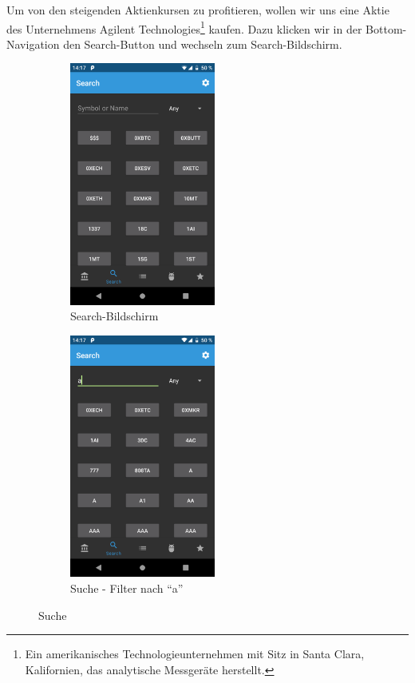 \documentclass[a4paper]{article}
\begin{document}
 Um von den steigenden Aktienkursen zu profitieren, wollen wir uns eine Aktie des Unternehmens Agilent Technologies\footnote{Ein amerikanisches Technologieunternehmen mit Sitz in Santa Clara, Kalifornien, das analytische Messgeräte herstellt.} kaufen. Dazu klicken wir in der Bottom-Navigation den Search-Button und wechseln zum Search-Bildschirm.

\begin{figure}[H]
	\begin{subfigure}{.5\textwidth}
		\centering
		\includegraphics[height=8cm,keepaspectratio]{./images/demo/search.png}
		\caption{Search-Bildschirm}
		\label{fig:demo:search_screen}
	\end{subfigure}
	\begin{subfigure}{.5\textwidth}
		\centering
		\includegraphics[height=8cm,keepaspectratio]{./images/demo/search_a.png}
		\caption{Suche - Filter nach "`a"'}
		\label{fig:demo:search_a}
	\end{subfigure}
	\caption{Suche}
	\label{fig:demo:search}
\end{figure}
\end{document}
